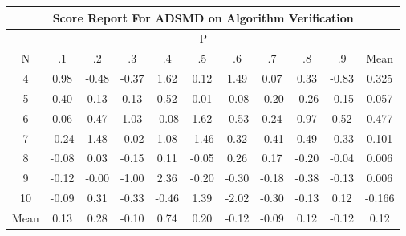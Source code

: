 \documentclass[11pt,a4paper]{report}
\begin{document}
\begin{longtable}{ | c || c | c | c | c | c | c | c | c | c || c |}
\hline
\multicolumn{11}{|c|}{ Score Report For ADSMD on Algorithm Verification} \\
\hline
\multicolumn{11}{|c|}{ P } \\
\hline
N & .1 & .2 & .3 & .4 & .5 & .6 & .7 & .8 & .9 & Mean\\
 \hline
 \hline
 \endhead
  4 &  \cellcolor[HTML]{E7E7FF} 0.98 &  \cellcolor[HTML]{FFEFEF} -0.48 &  \cellcolor[HTML]{FFF7F7} -0.37 &  \cellcolor[HTML]{D7D7FF} 1.62 &  \cellcolor[HTML]{FFFFFF} 0.12 &  \cellcolor[HTML]{D7D7FF} 1.49 &  \cellcolor[HTML]{FFFFFF} 0.07 &  \cellcolor[HTML]{F7F7FF} 0.33 &  \cellcolor[HTML]{FFE7E7} -0.83 & 0.325 \\
  5 &  \cellcolor[HTML]{F7F7FF} 0.40 &  \cellcolor[HTML]{FFFFFF} 0.13 &  \cellcolor[HTML]{FFFFFF} 0.13 &  \cellcolor[HTML]{EFEFFF} 0.52 &  \cellcolor[HTML]{FFFFFF} 0.01 &  \cellcolor[HTML]{FFFFFF} -0.08 &  \cellcolor[HTML]{FFF7F7} -0.20 &  \cellcolor[HTML]{FFF7F7} -0.26 &  \cellcolor[HTML]{FFFFFF} -0.15 & 0.057 \\
  6 &  \cellcolor[HTML]{FFFFFF} 0.06 &  \cellcolor[HTML]{F7F7FF} 0.47 &  \cellcolor[HTML]{E7E7FF} 1.03 &  \cellcolor[HTML]{FFFFFF} -0.08 &  \cellcolor[HTML]{D7D7FF} 1.62 &  \cellcolor[HTML]{FFEFEF} -0.53 &  \cellcolor[HTML]{F7F7FF} 0.24 &  \cellcolor[HTML]{E7E7FF} 0.97 &  \cellcolor[HTML]{EFEFFF} 0.52 & 0.477 \\
  7 &  \cellcolor[HTML]{FFF7F7} -0.24 &  \cellcolor[HTML]{D7D7FF} 1.48 &  \cellcolor[HTML]{FFFFFF} -0.02 &  \cellcolor[HTML]{E7E7FF} 1.08 &  \cellcolor[HTML]{FFD7D7} -1.46 &  \cellcolor[HTML]{F7F7FF} 0.32 &  \cellcolor[HTML]{FFF7F7} -0.41 &  \cellcolor[HTML]{EFEFFF} 0.49 &  \cellcolor[HTML]{FFF7F7} -0.33 & 0.101 \\
  8 &  \cellcolor[HTML]{FFFFFF} -0.08 &  \cellcolor[HTML]{FFFFFF} 0.03 &  \cellcolor[HTML]{FFFFFF} -0.15 &  \cellcolor[HTML]{FFFFFF} 0.11 &  \cellcolor[HTML]{FFFFFF} -0.05 &  \cellcolor[HTML]{F7F7FF} 0.26 &  \cellcolor[HTML]{F7F7FF} 0.17 &  \cellcolor[HTML]{FFF7F7} -0.20 &  \cellcolor[HTML]{FFFFFF} -0.04 & 0.006 \\
  9 &  \cellcolor[HTML]{FFFFFF} -0.12 &  \cellcolor[HTML]{FFFFFF} -0.00 &  \cellcolor[HTML]{FFE7E7} -1.00 &  \cellcolor[HTML]{C7C7FF} 2.36 &  \cellcolor[HTML]{FFF7F7} -0.20 &  \cellcolor[HTML]{FFF7F7} -0.30 &  \cellcolor[HTML]{FFF7F7} -0.18 &  \cellcolor[HTML]{FFF7F7} -0.38 &  \cellcolor[HTML]{FFFFFF} -0.13 & 0.006 \\
  10 &  \cellcolor[HTML]{FFFFFF} -0.09 &  \cellcolor[HTML]{F7F7FF} 0.31 &  \cellcolor[HTML]{FFF7F7} -0.33 &  \cellcolor[HTML]{FFF7F7} -0.46 &  \cellcolor[HTML]{DFDFFF} 1.39 &  \cellcolor[HTML]{FFCFCF} -2.02 &  \cellcolor[HTML]{FFF7F7} -0.30 &  \cellcolor[HTML]{FFFFFF} -0.13 &  \cellcolor[HTML]{FFFFFF} 0.12 & -0.166 \\
 \hline
 \hline
Mean &  \cellcolor[HTML]{FFFFFF} 0.13 &  \cellcolor[HTML]{F7F7FF} 0.28 &  \cellcolor[HTML]{FFFFFF} -0.10 &  \cellcolor[HTML]{EFEFFF} 0.74 &  \cellcolor[HTML]{F7F7FF} 0.20 &  \cellcolor[HTML]{FFFFFF} -0.12 &  \cellcolor[HTML]{FFFFFF} -0.09 &  \cellcolor[HTML]{FFFFFF} 0.12 &  \cellcolor[HTML]{FFFFFF} -0.12 &  \cellcolor[HTML]{FFFFFF} 0.12
\end{longtable}
\end{document}
